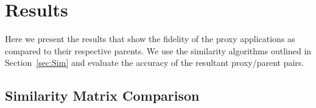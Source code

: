 \section{Results}
\label{sec:results}
Here we present the results that show the fidelity of the proxy applications as compared to their respective parents.
We use the similarity algorithms outlined in Section~\ref{sec:Sim} and evaluate the accuracy of the resultant proxy/parent pairs.   

\subsection{Similarity Matrix Comparison}
\label{sec:SimCom}

